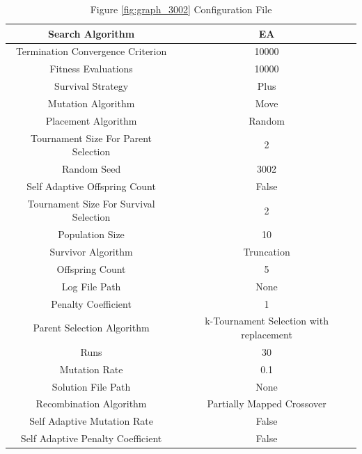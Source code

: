 \documentclass{standalone}
\begin{document}
\begin{table}[!htb]
	\centering
	\caption{Figure \ref{fig:graph_3002} Configuration File}
	\label{tab:graph_3002}
	\begin{tabular}{| c | c |}
		\hline
		Search Algorithm		& EA		 \\
		\hline
		Termination Convergence Criterion		& 10000		 \\
		\hline
		Fitness Evaluations		& 10000		 \\
		\hline
		Survival Strategy		& Plus		 \\
		\hline
		Mutation Algorithm		& Move		 \\
		\hline
		Placement Algorithm		& Random		 \\
		\hline
		Tournament Size For Parent Selection		& 2		 \\
		\hline
		Random Seed		& 3002		 \\
		\hline
		Self Adaptive Offspring Count		& False		 \\
		\hline
		Tournament Size For Survival Selection		& 2		 \\
		\hline
		Population Size		& 10		 \\
		\hline
		Survivor Algorithm		& Truncation		 \\
		\hline
		Offspring Count		& 5		 \\
		\hline
		Log File Path		& None		 \\
		\hline
		Penalty Coefficient		& 1		 \\
		\hline
		Parent Selection Algorithm		& k-Tournament Selection with replacement		 \\
		\hline
		Runs		& 30		 \\
		\hline
		Mutation Rate		& 0.1		 \\
		\hline
		Solution File Path		& None		 \\
		\hline
		Recombination Algorithm		& Partially Mapped Crossover		 \\
		\hline
		Self Adaptive Mutation Rate		& False		 \\
		\hline
		Self Adaptive Penalty Coefficient		& False		 \\
		\hline
	\end{tabular}
\end{table}
\end{document}
